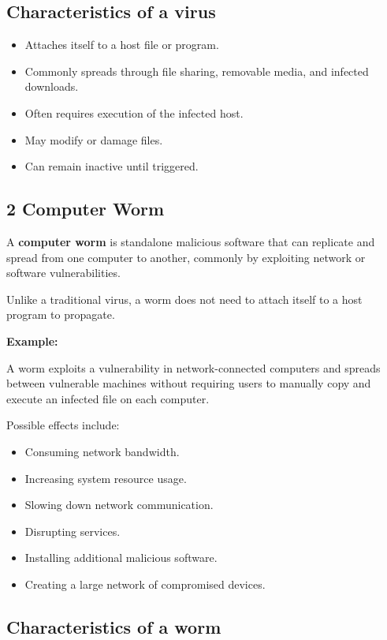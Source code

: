 \subsection{Characteristics of a virus}

\begin{itemize}
\item Attaches itself to a host file or program.
\item Commonly spreads through file sharing, removable media, and infected downloads.
\item Often requires execution of the infected host.
\item May modify or damage files.
\item Can remain inactive until triggered.
\end{itemize}

\subsection{2 Computer Worm}

A \textbf{computer worm} is standalone malicious software that can replicate and spread from one computer to another, commonly by exploiting network or software vulnerabilities.

Unlike a traditional virus, a worm does not need to attach itself to a host program to propagate.

\textbf{Example:}

A worm exploits a vulnerability in network-connected computers and spreads between vulnerable machines without requiring users to manually copy and execute an infected file on each computer.

Possible effects include:

\begin{itemize}
\item Consuming network bandwidth.
\item Increasing system resource usage.
\item Slowing down network communication.
\item Disrupting services.
\item Installing additional malicious software.
\item Creating a large network of compromised devices.
\end{itemize}

\subsection{Characteristics of a worm}

